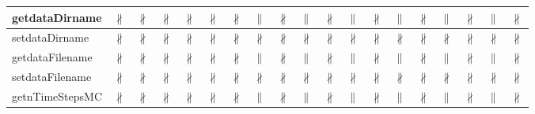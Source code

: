 \documentclass[10pt]{article}
\begin{document}
\begin{longtable}{|l|l|l|l|l|l|l|l|l|l|l|l|l|l|l|l|l|l|l|}
\hline
getdataDirname&{\color{BrickRed}$\nparallel$}&{\color{BrickRed}$\nparallel$}&{\color{BrickRed}$\nparallel$}&{\color{BrickRed}$\nparallel$}&{\color{BrickRed}$\nparallel$}&{\color{BrickRed}$\nparallel$}&{\color{blue}$\parallel$}&{\color{BrickRed}$\nparallel$}&{\color{blue}$\parallel$}&{\color{BrickRed}$\nparallel$}&{\color{blue}$\parallel$}&{\color{BrickRed}$\nparallel$}&{\color{blue}$\parallel$}&{\color{BrickRed}$\nparallel$}&{\color{blue}$\parallel$}&{\color{BrickRed}$\nparallel$}&{\color{blue}$\parallel$}&{\color{BrickRed}$\nparallel$}\\
\hline
setdataDirname&{\color{BrickRed}$\nparallel$}&{\color{BrickRed}$\nparallel$}&{\color{BrickRed}$\nparallel$}&{\color{BrickRed}$\nparallel$}&{\color{BrickRed}$\nparallel$}&{\color{BrickRed}$\nparallel$}&{\color{BrickRed}$\nparallel$}&{\color{BrickRed}$\nparallel$}&{\color{BrickRed}$\nparallel$}&{\color{BrickRed}$\nparallel$}&{\color{BrickRed}$\nparallel$}&{\color{BrickRed}$\nparallel$}&{\color{BrickRed}$\nparallel$}&{\color{BrickRed}$\nparallel$}&{\color{BrickRed}$\nparallel$}&{\color{BrickRed}$\nparallel$}&{\color{BrickRed}$\nparallel$}&{\color{BrickRed}$\nparallel$}\\
\hline
getdataFilename&{\color{BrickRed}$\nparallel$}&{\color{BrickRed}$\nparallel$}&{\color{BrickRed}$\nparallel$}&{\color{BrickRed}$\nparallel$}&{\color{BrickRed}$\nparallel$}&{\color{BrickRed}$\nparallel$}&{\color{blue}$\parallel$}&{\color{BrickRed}$\nparallel$}&{\color{blue}$\parallel$}&{\color{BrickRed}$\nparallel$}&{\color{blue}$\parallel$}&{\color{BrickRed}$\nparallel$}&{\color{blue}$\parallel$}&{\color{BrickRed}$\nparallel$}&{\color{blue}$\parallel$}&{\color{BrickRed}$\nparallel$}&{\color{blue}$\parallel$}&{\color{BrickRed}$\nparallel$}\\
\hline
setdataFilename&{\color{BrickRed}$\nparallel$}&{\color{BrickRed}$\nparallel$}&{\color{BrickRed}$\nparallel$}&{\color{BrickRed}$\nparallel$}&{\color{BrickRed}$\nparallel$}&{\color{BrickRed}$\nparallel$}&{\color{BrickRed}$\nparallel$}&{\color{BrickRed}$\nparallel$}&{\color{BrickRed}$\nparallel$}&{\color{BrickRed}$\nparallel$}&{\color{BrickRed}$\nparallel$}&{\color{BrickRed}$\nparallel$}&{\color{BrickRed}$\nparallel$}&{\color{BrickRed}$\nparallel$}&{\color{BrickRed}$\nparallel$}&{\color{BrickRed}$\nparallel$}&{\color{BrickRed}$\nparallel$}&{\color{BrickRed}$\nparallel$}\\
\hline
getnTimeStepsMC&{\color{BrickRed}$\nparallel$}&{\color{BrickRed}$\nparallel$}&{\color{BrickRed}$\nparallel$}&{\color{BrickRed}$\nparallel$}&{\color{BrickRed}$\nparallel$}&{\color{BrickRed}$\nparallel$}&{\color{blue}$\parallel$}&{\color{BrickRed}$\nparallel$}&{\color{blue}$\parallel$}&{\color{BrickRed}$\nparallel$}&{\color{blue}$\parallel$}&{\color{BrickRed}$\nparallel$}&{\color{blue}$\parallel$}&{\color{BrickRed}$\nparallel$}&{\color{blue}$\parallel$}&{\color{BrickRed}$\nparallel$}&{\color{blue}$\parallel$}&{\color{BrickRed}$\nparallel$}\\

\end{longtable}
\end{document}
